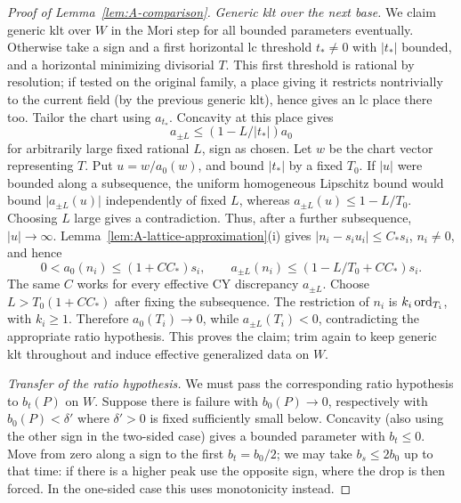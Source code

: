 \begin{proof}[Proof of Lemma~\ref{lem:A-comparison}]
\emph{Generic klt over the next base.}
We claim generic klt over \(W\) in the Mori step for all bounded parameters eventually.
Otherwise take a sign and a first horizontal lc threshold \(t_*\ne0\) with \(|t_*|\) bounded, and a horizontal minimizing divisorial \(T\).
This first threshold is rational by resolution; if tested on the original family, a place giving it restricts nontrivially to the current field (by the previous generic klt), hence gives an lc place there too.
Tailor the chart using \(a_{t_*}\).
Concavity at this place gives
\[
              a_{\pm L}\le (1-L/|t_*|)a_0
\]
for arbitrarily large fixed rational \(L\), sign as chosen.
Let \(w\) be the chart vector representing \(T\).
Put \(u=w/a_0(w)\), and bound \(\lvert t_*\rvert\) by a fixed
\(T_0\).  If \(\lvert u\rvert\) were bounded along a subsequence,
the uniform homogeneous Lipschitz bound would bound
\(\lvert a_{\pm L}(u)\rvert\) independently of fixed \(L\), whereas
\(a_{\pm L}(u)\le1-L/T_0\).  Choosing \(L\) large gives a
contradiction.  Thus, after a further subsequence,
\(\lvert u\rvert\to\infty\).
Lemma~\ref{lem:A-lattice-approximation}\textup{(i)} gives
\(\lvert n_i-s_i u_i\rvert\le C_*s_i\), \(n_i\ne0\), and hence
\[
 0<a_0(n_i)\le (1+CC_*)s_i,\qquad
 a_{\pm L}(n_i)\le(1-L/T_0+CC_*)s_i .
\]
The same \(C\) works for every effective CY discrepancy
\(a_{\pm L}\).
Choose \(L>T_0(1+CC_*)\) after fixing the subsequence.
The restriction of \(n_i\) is \(k_i\operatorname{ord}_{T_i}\), with
\(k_i\ge1\).  Therefore \(a_0(T_i)\to0\), while
\(a_{\pm L}(T_i)<0\), contradicting the appropriate ratio
hypothesis.
This proves the claim; trim again to keep generic klt throughout and induce effective generalized data on \(W\).

\emph{Transfer of the ratio hypothesis.}
We must pass the corresponding ratio hypothesis to \(b_t(P)\) on \(W\).
Suppose there is failure with \(b_0(P)\to0\), respectively with \(b_0(P)<\delta'\) where \(\delta'>0\) is fixed sufficiently small below.
Concavity (also using the other sign in the two-sided case) gives a bounded parameter with \(b_t\le0\).
Move from zero along a sign to the first \(b_t=b_0/2\); we may take \(b_s\le2b_0\) up to that time: if there is a higher peak use the opposite sign, where the drop is then forced.
In the one-sided case this uses monotonicity instead.


\end{proof}
